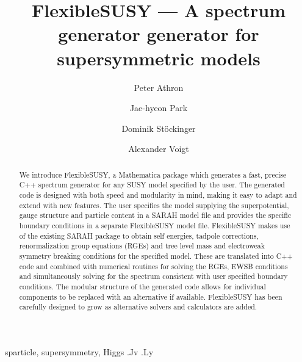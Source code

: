 \documentclass[final,3p,11pt,pdflatex]{elsarticle}
\makeatletter
\newcommand{\sarah}{SARAH\@\xspace}
\newcommand{\fs}{FlexibleSUSY\@\xspace}
\newcommand{\mathematica}{Mathematica\xspace}
\makeatother
\begin{document}
\begin{frontmatter}

 \title{\Large\bf FlexibleSUSY --- A spectrum generator generator for supersymmetric models}

\author[adelaide]{Peter Athron}
\author[valencia]{Jae-hyeon Park}
\author[dresden]{Dominik St\"ockinger}
\author[dresden]{Alexander Voigt}
\address[adelaide]{ARC Centre of Excellence for Particle Physics at 
the Tera-scale, School of Chemistry and Physics, University of Adelaide, 
Adelaide SA 5005 Australia}
\address[valencia]{Departament de F\'{i}sica Te\`{o}rica and IFIC,
Universitat de Val\`{e}ncia-CSIC,
46100, Burjassot, Spain}
\address[dresden]{Institut f\"ur Kern- und Teilchenphysik,
TU Dresden, Zellescher Weg 19, 01069 Dresden, Germany}
   
  \begin{abstract}
   We introduce \fs, a \mathematica package which generates a fast,
   precise C++ spectrum generator for any SUSY model specified by the
   user.  The generated code is designed with both speed and
   modularity in mind, making it easy to adapt and extend with new
   features. The user specifies the model supplying the
   superpotential, gauge structure and particle content in a \sarah
   model file and provides the specific boundary conditions in a
   separate \fs model file. \fs makes use of the existing \sarah
   package to obtain self energies, tadpole corrections,
   renormalization group equations (RGEs) and tree level mass and
   electroweak symmetry breaking conditions for the specified model. These are
   translated into C++ code and combined  with numerical
   routines for solving the RGEs, EWSB conditions and simultaneously
   solving for the spectrum consistent with user specified boundary
   conditions.  The modular structure of the generated code allows for
   individual components to be replaced with an alternative if
   available. \fs has been carefully designed to grow as
   alternative solvers and calculators are added.
  \end{abstract}

\begin{keyword}
sparticle, 
supersymmetry, 
Higgs
.Jv
.Ly
\end{keyword}
\end{frontmatter}
\end{document}
